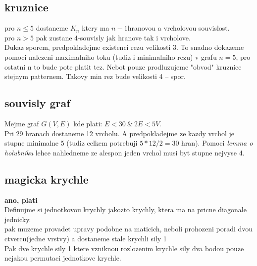 \documentclass[a4paper]{article}
\begin{document}
\subsection{kruznice}
pro $n \leq 5$ dostaneme $K_n$ ktery ma $n-1$hranovou a vrcholovou souvislost.\\
pro $n > 5$ pak zustane 4-souvisly jak hranove tak i vrcholove.\\ 
Dukaz sporem, predpokladejme existenci rezu velikosti 3.
To snadno dokazeme pomoci nalezeni maximalniho toku
(tudiz i minimalniho rezu) v grafu $n=5$, pro ostatni n to bude pote platit tez.
Nebot pouze prodluzujeme "obvod" kruznice stejnym patternem. Takovy
min rez bude velikosti 4 -- spor.



\subsection{souvisly graf}
Mejme graf $G(V,E)$ kde plati: $E<30~\&~2E < 5V$.\\
Pri 29 hranach dostaneme 12 vrcholu. A predpokladejme ze kazdy
vrchol je stupne minimalne 5 (tudiz celkem potrebuji $5*12/2=30$ hran).
Pomoci \textit{lemma o holubniku} lehce nahledneme ze
alespon jeden vrchol musi byt stupne nejvyse 4.


\subsection{magicka krychle}
\textbf{ano, plati}\\
Definujme si jednotkovou krychly jakozto krychly, ktera ma na pricne diagonale
jednicky.\\
pak muzeme provadet upravy podobne na maticich, neboli prohozeni poradi dvou
ctvercu(jedne vrstvy) a dostaneme stale krychli sily 1\\
Pak dve krychle sily 1 ktere vzniknou rozlozenim krychle sily dva bodou pouze
nejakou permutaci jednotkove krychle.
\end{document}
